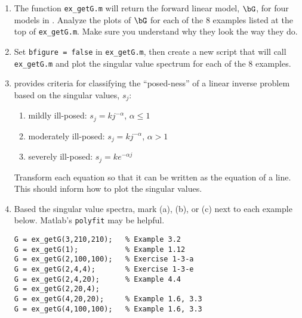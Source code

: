 \documentclass[11pt,titlepage,fleqn]{article}
\begin{document}
\begin{enumerate}
\item The function \verb+ex_getG.m+ will return the forward linear model, $\bG$, for four models in \citet{AsterE2}. Analyze the plots of $\bG$ for each of the 8 examples listed at the top of \verb+ex_getG.m+. Make sure you understand why they look the way they do.

\item Set \verb+bfigure = false+ in \verb+ex_getG.m+, then create a new script that will call \verb+ex_getG.m+ and plot the singular value spectrum for each of the 8 examples.

\item \citet[][p.~74]{AsterE2} provides criteria for classifying the ``posed-ness'' of a linear inverse problem based on the singular values, $s_j$:
%
\begin{enumerate}
\renewcommand{\theenumi}{\Alph{enumi}}
\item mildly ill-posed: $s_j = k j^{-\alpha}$, $\alpha \le 1$
\item moderately ill-posed: $s_j = k j^{-\alpha}$, $\alpha > 1$
\item severely ill-posed: $s_j = k e^{-\alpha j}$
\end{enumerate}
%
Transform each equation so that it can be written as the equation of a line. This should inform how to plot the singular values.

\item Based the singular value spectra, mark (a), (b), or (c) next to each example below. Matlab's \verb+polyfit+ may be helpful. 
%
\begin{spacing}{1.5}
\begin{verbatim}
G = ex_getG(3,210,210);   % Example 3.2
G = ex_getG(1);           % Example 1.12
G = ex_getG(2,100,100);   % Exercise 1-3-a
G = ex_getG(2,4,4);       % Exercise 1-3-e
G = ex_getG(2,4,20);      % Example 4.4
G = ex_getG(2,20,4);
G = ex_getG(4,20,20);     % Example 1.6, 3.3
G = ex_getG(4,100,100);   % Example 1.6, 3.3
\end{verbatim}
\end{spacing}
%
\end{enumerate}




\end{document}
